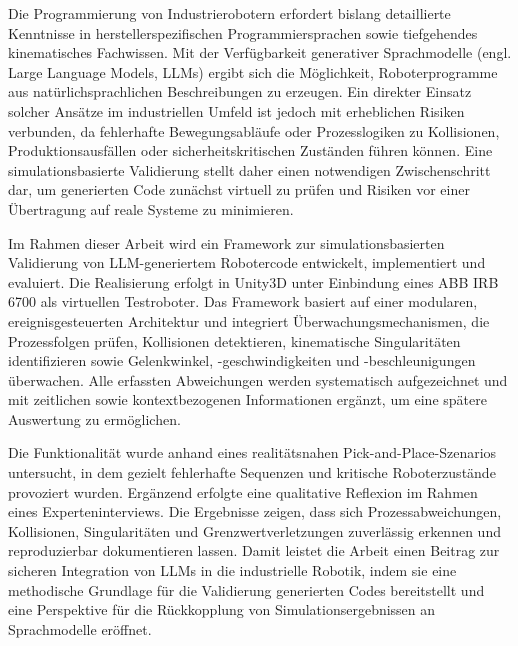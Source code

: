Die Programmierung von Industrierobotern erfordert bislang
detaillierte Kenntnisse in herstellerspezifischen Programmiersprachen
sowie tiefgehendes kinematisches Fachwissen. Mit der Verfügbarkeit
generativer Sprachmodelle (engl. Large Language Models, LLMs) ergibt sich
die Möglichkeit, Roboterprogramme aus natürlichsprachlichen
Beschreibungen zu erzeugen. Ein direkter Einsatz solcher Ansätze im
industriellen Umfeld ist jedoch mit erheblichen Risiken verbunden, da
fehlerhafte Bewegungsabläufe oder Prozesslogiken zu Kollisionen,
Produktionsausfällen oder sicherheitskritischen Zuständen führen
können. Eine simulationsbasierte Validierung stellt daher einen
notwendigen Zwischenschritt dar, um generierten Code zunächst
virtuell zu prüfen und Risiken vor einer Übertragung auf reale
Systeme zu minimieren.

Im Rahmen dieser Arbeit wird ein Framework zur simulationsbasierten
Validierung von LLM-generiertem Robotercode entwickelt, implementiert
und evaluiert. Die Realisierung erfolgt in Unity3D unter Einbindung
eines ABB IRB 6700 als virtuellen Testroboter. Das Framework basiert
auf einer modularen, ereignisgesteuerten Architektur und integriert
Überwachungsmechanismen, die Prozessfolgen prüfen, Kollisionen
detektieren, kinematische Singularitäten identifizieren sowie
Gelenkwinkel, -geschwindigkeiten und -beschleunigungen überwachen.
Alle erfassten Abweichungen werden systematisch aufgezeichnet und mit
zeitlichen sowie kontextbezogenen Informationen ergänzt, um eine
spätere Auswertung zu ermöglichen.

Die Funktionalität wurde anhand eines realitätsnahen
Pick-and-Place-Szenarios untersucht, in dem gezielt fehlerhafte
Sequenzen und kritische Roboterzustände provoziert wurden. Ergänzend
erfolgte eine qualitative Reflexion im Rahmen eines
Experteninterviews. Die Ergebnisse zeigen, dass sich
Prozessabweichungen, Kollisionen, Singularitäten und
Grenzwertverletzungen zuverlässig erkennen und reproduzierbar
dokumentieren lassen. Damit leistet die Arbeit einen Beitrag zur
sicheren Integration von LLMs in die industrielle Robotik, indem sie
eine methodische Grundlage für die Validierung generierten Codes
bereitstellt und eine Perspektive für die Rückkopplung von
Simulationsergebnissen an Sprachmodelle eröffnet.
